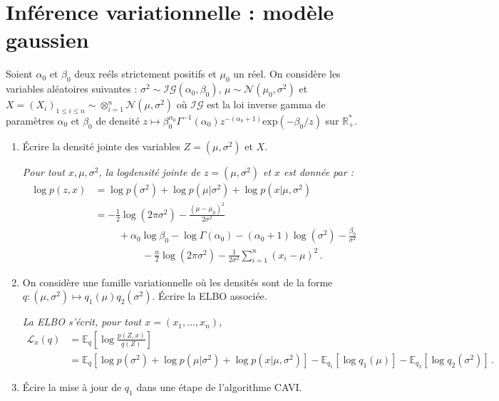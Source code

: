 \documentclass[a4paper,10pt,fleqn]{article}
\newcommand{\1}{\ensuremath{\mathbbm{1}}}
\begin{document}
\section{Inf\'erence variationnelle : mod\`ele gaussien}
Soient $\alpha_0$ et $\beta_0$ deux re\'els strictement positifs et $\mu_0$ un r\'eel. On consid\`ere les variables al\'eatoires suivantes : $\sigma^2 \sim\mathcal{IG}(\alpha_0,\beta_0)$, $\mu\sim\mathcal{N}(\mu_0,\sigma^2)$ et $X = (X_i)_{1\leq i\leq n}\sim\otimes_{i=1}^n\mathcal{N}(\mu,\sigma^2)$ o\`u $\mathcal{IG}$ est la loi inverse gamma de param\`etres $\alpha_0$ et $\beta_0$ de densit\'e $z\mapsto \beta_0^{\alpha_0}\Gamma^{-1}(\alpha_0)z^{-(\alpha_0+1)}\mathrm{exp}(-\beta_0/z)$ sur $\mathbb{R}_+^*$.
\begin{enumerate}
\item \'Ecrire la densit\'e jointe des variables $Z=(\mu,\sigma^2)$ et $X$.

\vspace{.2cm}

{\em
Pour tout $x,\mu,\sigma^2$, la logdensit\'e jointe de $z=(\mu,\sigma^2)$ et $x$ est donn\'ee par :
\begin{align*}
\log p (z,x) &= \log p(\sigma^2) + \log p(\mu|\sigma^2) + \log p(x|\mu,\sigma^2)\\
&= -\frac{1}{2}\log(2\pi \sigma^2) - \frac{(\mu-\mu_0)^2}{2\sigma^2} \\
&\hspace{1cm} + \alpha_0\log \beta_0 - \log \Gamma(\alpha_0) - (\alpha_0+1)\log(\sigma^{2}) - \frac{\beta_0}{\sigma^2}\\
&\hspace{2cm} -\frac{n}{2}\log(2\pi \sigma^2) - \frac{1}{2\sigma^2}\sum_{i=1}^n(x_i-\mu)^2\,.
\end{align*}
}

\item On consid\`ere une famille variationnelle o\`u les densit\'es sont de la forme $q:(\mu,\sigma^2)\mapsto q_1(\mu)q_{2}(\sigma^2)$. \'Ecrire la ELBO associ\'ee.

\vspace{.2cm}

{\em
La ELBO s'\'ecrit, pour tout $x = (x_1,\ldots,x_n)$,
\begin{align*}
\mathcal{L}_x(q) &= \mathbb{E}_q\left[\log\frac{p(Z,x)}{q(Z)}\right]\\
&= \mathbb{E}_q\left[\log p(\sigma^2) + \log p(\mu|\sigma^2) + \log p(x|\mu,\sigma^2)\right] - \mathbb{E}_{q_1}\left[\log q_{1}(\mu)\right] - \mathbb{E}_{q_{2}}\left[\log q_{2}(\sigma^2)\right]\,.
\end{align*}
}
\item \'Ecire la mise \`a jour de $q_1$ dans une \'etape de l'algorithme CAVI. 


\end{enumerate}
\end{document}
